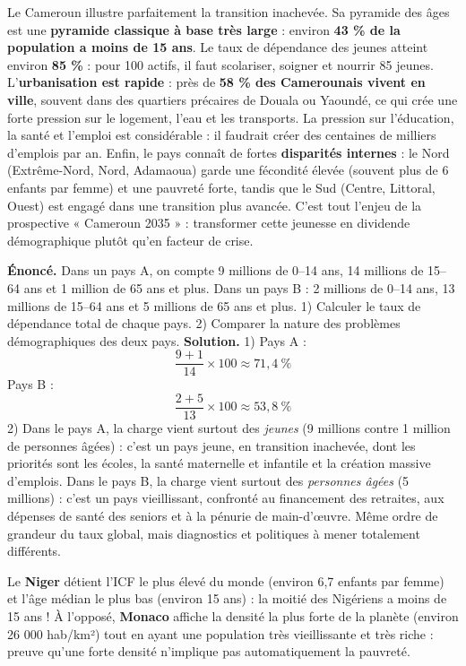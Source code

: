 \documentclass[11pt]{article}
\newcounter{popsec}
\newcounter{popsub}
\newcommand{\courssub}[1]{%
  \stepcounter{popsub}%
  \par\vspace{9pt}\noindent{\popxbold\fontsize{11.5}{13}\selectfont\color{popink}{\color{poporange}\thepopsec.\thepopsub}\hspace{6pt}#1}\par\nopagebreak\vspace{4pt}
}
\begin{document}
\courssub{Le cas du Cameroun : une jeunesse à la fois atout et défi}

Le Cameroun illustre parfaitement la transition inachevée. Sa pyramide des âges est une \textbf{pyramide classique à base très large} : environ \textbf{43 \% de la population a moins de 15 ans}. Le taux de dépendance des jeunes atteint environ \textbf{85 \%} : pour 100 actifs, il faut scolariser, soigner et nourrir 85 jeunes. L'\textbf{urbanisation est rapide} : près de \textbf{58 \% des Camerounais vivent en ville}, souvent dans des quartiers précaires de Douala ou Yaoundé, ce qui crée une forte pression sur le logement, l'eau et les transports. La pression sur l'éducation, la santé et l'emploi est considérable : il faudrait créer des centaines de milliers d'emplois par an. Enfin, le pays connaît de fortes \textbf{disparités internes} : le Nord (Extrême-Nord, Nord, Adamaoua) garde une fécondité élevée (souvent plus de 6 enfants par femme) et une pauvreté forte, tandis que le Sud (Centre, Littoral, Ouest) est engagé dans une transition plus avancée. C'est tout l'enjeu de la prospective « Cameroun 2035 » : transformer cette jeunesse en dividende démographique plutôt qu'en facteur de crise.

\begin{exoresolu}
\textbf{Énoncé.} Dans un pays A, on compte 9 millions de 0--14 ans, 14 millions de 15--64 ans et 1 million de 65 ans et plus. Dans un pays B : 2 millions de 0--14 ans, 13 millions de 15--64 ans et 5 millions de 65 ans et plus. 1) Calculer le taux de dépendance total de chaque pays. 2) Comparer la nature des problèmes démographiques des deux pays.
\tcblower
\textbf{Solution.} 1) Pays A :
\[ \frac{9 + 1}{14} \times 100 \approx 71{,}4\ \% \]
Pays B :
\[ \frac{2 + 5}{13} \times 100 \approx 53{,}8\ \% \]
2) Dans le pays A, la charge vient surtout des \emph{jeunes} (9 millions contre 1 million de personnes âgées) : c'est un pays jeune, en transition inachevée, dont les priorités sont les écoles, la santé maternelle et infantile et la création massive d'emplois. Dans le pays B, la charge vient surtout des \emph{personnes âgées} (5 millions) : c'est un pays vieillissant, confronté au financement des retraites, aux dépenses de santé des seniors et à la pénurie de main-d'œuvre. Même ordre de grandeur du taux global, mais diagnostics et politiques à mener totalement différents.
\end{exoresolu}

\begin{savaistu}
Le \textbf{Niger} détient l'ICF le plus élevé du monde (environ 6,7 enfants par femme) et l'âge médian le plus bas (environ 15 ans) : la moitié des Nigériens a moins de 15 ans ! À l'opposé, \textbf{Monaco} affiche la densité la plus forte de la planète (environ 26 000 hab/km²) tout en ayant une population très vieillissante et très riche : preuve qu'une forte densité n'implique pas automatiquement la pauvreté.
\end{savaistu}
\end{document}

